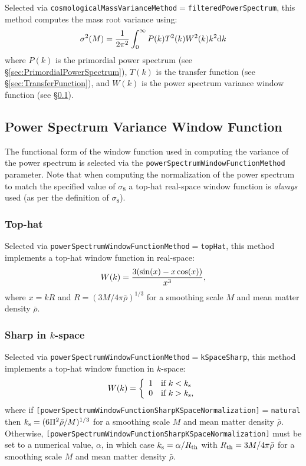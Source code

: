Selected via {\tt cosmologicalMassVarianceMethod}$=${\tt filteredPowerSpectrum}, this method computes the mass root variance using:
\begin{equation}
 \sigma^2(M) = {1 \over 2 \pi^2} \int_0^\infty P(k) T^2(k) W^2(k) k^2 {\rm d}k
\end{equation}
where $P(k)$ is the primordial power spectrum (see \S\ref{sec:PrimordialPowerSpectrum}), $T(k)$ is the transfer function (see \S\ref{sec:TransferFunction}), and $W(k)$ is the power spectrum variance window function (see \S\ref{sec:PowerSpectrumWindowFunctionPhysics}).

\subsection{Power Spectrum Variance Window Function}\label{sec:PowerSpectrumWindowFunctionPhysics}

The functional form of the window function used in computing the variance of the power spectrum is selected via the {\tt powerSpectrumWindowFunctionMethod} parameter. Note that when computing the normalization of the power spectrum to match the specified value of $\sigma_8$ a top-hat real-space window function is \emph{always} used (as per the definition of $\sigma_8$).

\subsubsection{Top-hat}

Selected via {\tt powerSpectrumWindowFunctionMethod}$=${\tt topHat}, this method implements a top-hat window function in real-space:
\begin{equation}
 W(k) = {3 (\sin(x)-x \cos(x)) \over x^3},
\end{equation}
where $x = k R$ and $R=(3M/4\pi\bar{\rho})^{1/3}$ for a smoothing scale $M$ and mean matter density $\bar{\rho}$.

\subsubsection{Sharp in $k$-space}

Selected via {\tt powerSpectrumWindowFunctionMethod}$=${\tt kSpaceSharp}, this method implements a top-hat window function in $k$-space:
\begin{equation}
 W(k) = \left\{ \begin{array}{ll} 1 & \hbox{if } k < k_{\rm s} \\ 0 & \hbox{if } k > k_{\rm s}, \end{array} \right.
\end{equation}
where if {\tt [powerSpectrumWindowFunctionSharpKSpaceNormalization]}$=${\tt natural} then $k_{\rm s} = (6 \Pi^2 \bar{\rho} / M)^{1/3}$ for a smoothing scale $M$ and mean matter density $\bar{\rho}$. Otherwise, {\tt [powerSpectrumWindowFunctionSharpKSpaceNormalization]} must be set to a numerical value, $\alpha$, in which case $k_{\rm s} = \alpha / R_{\rm th}$ with $R_{\rm th}=3M/4\pi\bar{\rho}$ for a smoothing scale $M$ and mean matter density $\bar{\rho}$.

